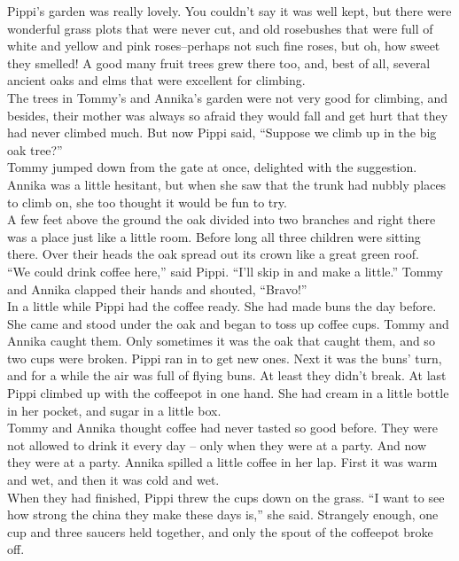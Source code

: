 \documentclass{standard}
\begin{document}
Pippi’s garden was really lovely. You couldn’t say it was well kept, but there were wonderful grass plots that were never cut, and old rosebushes that were full of white and yellow and pink roses--perhaps not such fine roses, but oh, how sweet they smelled! A good many fruit trees grew there too, and, best of all, several ancient oaks and elms that were excellent for climbing.\\

The trees in Tommy’s and Annika’s garden were not very good for climbing, and besides, their mother was always so afraid they would fall and get hurt that they had never climbed much. But now Pippi said, “Suppose we climb up in the big oak tree?”\\

Tommy jumped down from the gate at once, delighted with the suggestion. Annika was a little hesitant, but when she saw that the trunk had nubbly places to climb on, she too thought it would be fun to try.\\

A few feet above the ground the oak divided into two branches and right there was a place just like a little room. Before long all three children were sitting there. Over their heads the oak spread out its crown like a great green roof.\\

“We could drink coffee here,” said Pippi. “I’ll skip in and make a little.” Tommy and Annika clapped their hands and shouted, “Bravo!”\\

In a little while Pippi had the coffee ready. She had made buns the day before. She came and stood under the oak and began to toss up coffee cups. Tommy and Annika caught them. Only sometimes it was the oak that caught them, and so two cups were broken. Pippi ran in to get new ones. Next it was the buns’ turn, and for a while the air was full of flying buns. At least they didn’t break. At last Pippi climbed up with the coffeepot in one hand. She had cream in a little bottle in her pocket, and sugar in a little box.\\

Tommy and Annika thought coffee had never tasted so good before. They were not allowed to drink it every day -- only when they were at a party. And now they were at a party. Annika spilled a little coffee in her lap. First it was warm and wet, and then it was cold and wet.\\

When they had finished, Pippi threw the cups down on the grass. “I want to see how strong the china they make these days is,” she said. Strangely enough, one cup and three saucers held together, and only the spout of the coffeepot broke off.\\
\end{document}
